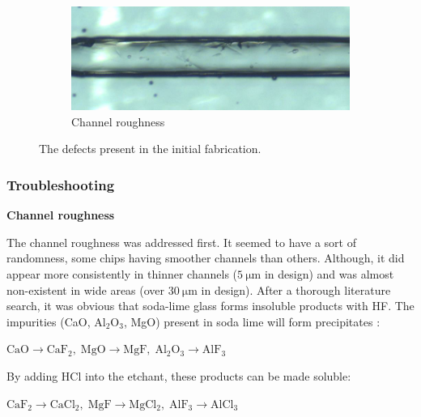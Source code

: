 \documentclass[final]{jyflluk}
\begin{document}
\begin{figure}[!h]
    \vspace{1cm}
    \begin{subfigure}{\textwidth}
    \centering
        \includegraphics[width=\linewidth]{optical/roughness2.png} 
        \caption{Channel roughness} \label{fig:roughness}
    \end{subfigure}
    \caption{The defects present in the initial fabrication.} \label{fig:pinhole}
\end{figure}



\subsubsection{Troubleshooting}

\begin{flushleft}\textbf{Channel roughness} \end{flushleft}
The channel roughness was addressed first. It seemed to have a sort of randomness, some chips having smoother channels than others. Although, it did appear more consistently in thinner channels ($\SI{5}{\micro \metre}$ in design) and was almost non-existent in wide areas (over $\SI{30}{\micro \metre}$ in design). After a thorough literature search, it was obvious that soda-lime glass forms insoluble products with HF. The impurities (CaO, $\mathrm{Al_2 O_3}$, MgO) present in soda lime will form precipitates \cite{lin2001fast,iliescu2005characterization}:
\newline
\centerline{$\mathrm{ CaO \rightarrow CaF_2,\; MgO \rightarrow MgF, \; Al_2 O_3 \rightarrow AlF_3}$}
\newline
By adding HCl into the etchant, these products can be made soluble:
\newline
\centerline{$\mathrm{CaF_2 \rightarrow CaCl_2, \; MgF \rightarrow MgCl_2, \; AlF_3 \rightarrow AlCl_3}$}
\end{document}
